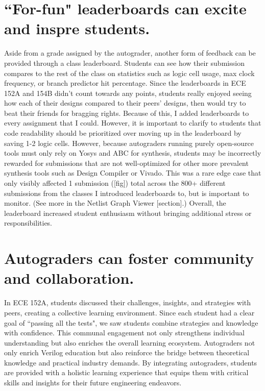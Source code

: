 \section{``For-fun" leaderboards can excite and inspre students.}

Aside from a grade assigned by the autograder, another form of feedback can be provided through a class leaderboard. Students can see how their submission compares to the rest of the class on statistics such as logic cell usage, max clock frequency, or branch predictor hit percentage. Since the leaderboards in ECE 152A and 154B didn't count towards any points, students really enjoyed seeing how each of their designs compared to their peers' designs, then would try to beat their friends for bragging rights. Because of this, I added leaderboards to every assignment that I could. However, it is important to clarify to students that code readability should be prioritized over moving up in the leaderboard by saving 1-2 logic cells. However, because autograders running purely open-source tools must only rely on Yosys and ABC for synthesis, students may be incorrectly rewarded for submissions that are not well-optimized for other more prevalent synthesis tools such as Design Compiler or Vivado. This was a rare edge case that only visibly affected 1 submission ([fig]) total across the 800+ different submissions from the classes I introduced leaderboards to, but is important to monitor. (See more in the Netlist Graph Viewer [section].) Overall, the leaderboard increased student enthusiasm without bringing additional stress or responsibilities.

\section{Autograders can foster community and collaboration.}

In ECE 152A, students discussed their challenges, insights, and strategies with peers, creating a collective learning environment. Since each student had a clear goal of ``passing all the tests", we saw students combine strategies and knowledge with confidence. This communal engagement not only strengthens individual understanding but also enriches the overall learning ecosystem. Autograders not only enrich Verilog education but also reinforce the bridge between theoretical knowledge and practical industry demands. By integrating autograders, students are provided with a holistic learning experience that equips them with critical skills and insights for their future engineering endeavors.
